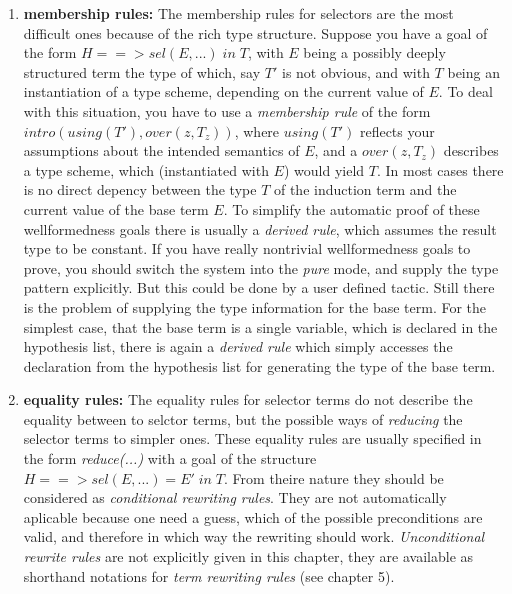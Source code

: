 \documentclass[11pt]{report}
\newcommand{\inv}[1]{\index{#1}}
\begin{document}
\begin {itemize}
\begin{enumerate}
 \item
 {\bf membership rules:}
 \inv{membership rules}
 The membership rules for selectors are the most difficult 
 ones because of the rich type structure. 
 Suppose you have a goal of the form $H==>sel(E,...)\;in\;T$,
 with $E$ being a possibly deeply structured term the type of
 which, say $T'$ is not obvious, and with $T$ being an instantiation
 of a type scheme, depending on the current value of $E$.
 To deal with this situation, you have to use a 
 \emph{membership rule} of the form $intro(using(T'),over(z,T_z))$,
 where $using(T')$ reflects your assumptions  about the intended 
 semantics of $E$, and a $over(z,T_z)$ describes a type scheme,
 which (instantiated with $E$) would yield $T$.
 In most cases there is no direct
 depency between the type $T$ of the induction term and the current
 value of the base term $E$. To simplify
 the automatic proof of these wellformedness goals there is
 usually 
 \inv{derived rule}
 a \emph{derived rule}, which assumes the result type to be constant.
 If you have really nontrivial wellformedness goals to prove,
 you should switch the system into the \emph{pure} mode, and
 supply the type pattern explicitly. But this could be done
 by a user defined tactic. Still there is the problem of
 supplying the type information for the base term. For the
 simplest case, that the base term is a single variable, which
 is declared in the hypothesis list, there is again a \emph{derived 
 rule} which simply accesses the declaration from the hypothesis
 list for generating the type of the base term.
 
 \item
 {\bf equality rules:}
 \inv{equality rules}
 The equality rules for selector terms do not describe the
 equality between to selctor terms, but the possible ways
 of \emph{reducing} the selector terms to simpler ones.
 These equality rules are usually specified in the form
 \emph{reduce(...)} with a goal of the structure 
 $H==>sel(E,...)=E'\;in\;T$. From theire nature they should be
 considered as \emph{conditional rewriting rules}. They are not
 automatically aplicable because one need a guess, which of
 the possible preconditions are valid, and therefore in which
 way the rewriting should work. \emph{Unconditional rewrite rules}
 are not explicitly given in this chapter, they are available
 as shorthand notations for \emph{term rewriting rules} (see
 chapter 5).
 \end{enumerate}
 \end{itemize}
 
\end{document}
